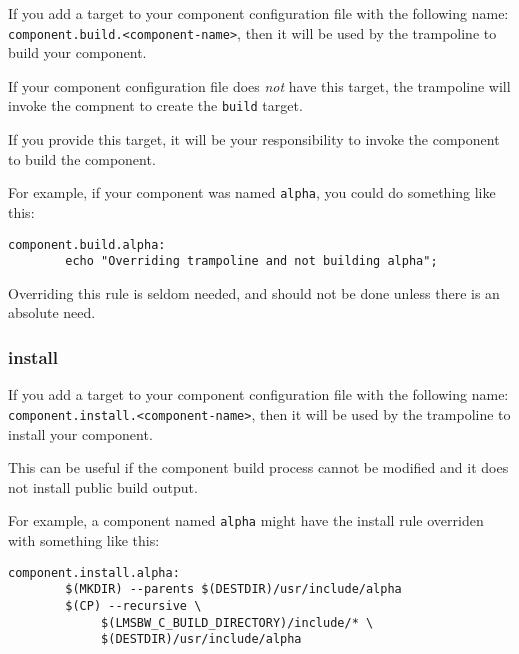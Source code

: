 If you add a \makefile target to your component configuration file
with the following name:
\texttt{component.build.}\texttt{<component-name>}, then it will be
used by the trampoline \makefile to build your component.

If your component configuration file does \emph{not} have this target,
the trampoline \makefile will invoke the compnent \makefile to create
the \texttt{build} target.

If you provide this target, it will be your responsibility to invoke
the component \makefile to build the component.

For example, if your component was named \texttt{alpha}, you could do
something like this:

\begin{verbatim}
component.build.alpha:
        echo "Overriding trampoline and not building alpha";

\end{verbatim}

Overriding this rule is seldom needed, and should not be done unless
there is an absolute need.

\subsubsection{install}\label{wrap:override-target-install}

If you add a \makefile target to your component configuration file
with the following name:
\texttt{component.install.}\texttt{<component-name>}, then it will be
used by the trampoline \makefile to install your component.

This can be useful if the component build process cannot be modified
and it does not install public build output.

For example, a component named \texttt{alpha} might have the install
rule overriden with something like this:

\begin{verbatim}
component.install.alpha:
        $(MKDIR) --parents $(DESTDIR)/usr/include/alpha
        $(CP) --recursive \
             $(LMSBW_C_BUILD_DIRECTORY)/include/* \
             $(DESTDIR)/usr/include/alpha
\end{verbatim}

